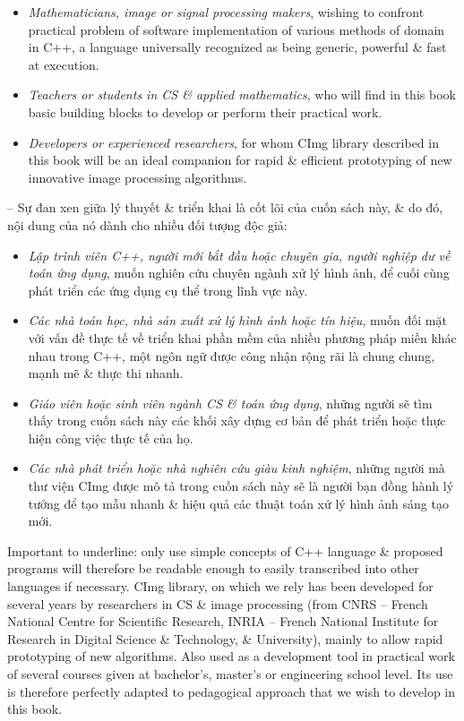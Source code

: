 \documentclass{article}
\begin{document}
\begin{itemize}
\begin{itemize}
\begin{itemize}
            \item {\it Mathematicians, image or signal processing makers}, wishing to confront practical problem of software implementation of various methods of domain in C++, a language universally recognized as being generic, powerful \& fast at execution.
            \item {\it Teachers or students in CS \& applied mathematics}, who will find in this book basic building blocks to develop or perform their practical work.
            \item {\it Developers or experienced researchers}, for whom CImg library described in this book will be an ideal companion for rapid \& efficient prototyping of new innovative image processing algorithms.
        \end{itemize}
        -- Sự đan xen giữa lý thuyết \& triển khai là cốt lõi của cuốn sách này, \& do đó, nội dung của nó dành cho nhiều đối tượng độc giả:
        \begin{itemize}
            \item {\it Lập trình viên C++, người mới bắt đầu hoặc chuyên gia, người nghiệp dư về toán ứng dụng}, muốn nghiên cứu chuyên ngành xử lý hình ảnh, để cuối cùng phát triển các ứng dụng cụ thể trong lĩnh vực này.
            \item {\it Các nhà toán học, nhà sản xuất xử lý hình ảnh hoặc tín hiệu}, muốn đối mặt với vấn đề thực tế về triển khai phần mềm của nhiều phương pháp miền khác nhau trong C++, một ngôn ngữ được công nhận rộng rãi là chung chung, mạnh mẽ \& thực thi nhanh.
            \item {\it Giáo viên hoặc sinh viên ngành CS \& toán ứng dụng}, những người sẽ tìm thấy trong cuốn sách này các khối xây dựng cơ bản để phát triển hoặc thực hiện công việc thực tế của họ.
            \item {\it Các nhà phát triển hoặc nhà nghiên cứu giàu kinh nghiệm}, những người mà thư viện CImg được mô tả trong cuốn sách này sẽ là người bạn đồng hành lý tưởng để tạo mẫu nhanh \& hiệu quả các thuật toán xử lý hình ảnh sáng tạo mới.
        \end{itemize}
        Important to underline: only use simple concepts of C++ language \& proposed programs will therefore be readable enough to easily transcribed into other languages if necessary. CImg library, on which we rely has been developed for several years by researchers in CS \& image processing (from CNRS -- French National Centre for Scientific Research, INRIA -- French National Institute for Research in Digital Science \& Technology, \& University), mainly to allow rapid prototyping of new algorithms. Also used as a development tool in practical work of several courses given at bachelor's, master's or engineering school level. Its use is therefore perfectly adapted to pedagogical approach that we wish to develop in this book.
        

\end{itemize}
\end{itemize}
\end{document}
